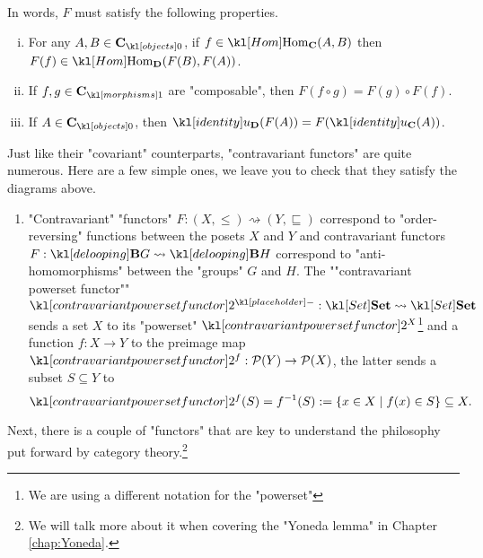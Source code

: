\documentclass[main.tex]{subfiles}
\begin{document}
\begin{defn}
\begin{minipage}{0.49\textwidth}
\begin{equation}
		\end{equation}
	\end{minipage}\\
	In words, $F$ must satisfy the following properties.
	\begin{enumerate}[i.]
		\item For any $A, B \in \obj{\mathbf{C}}$, if $f \in \Hom_{\mathbf{C}}(A,B)$ then $F(f) \in \Hom_{\mathbf{D}}(F(B), F(A))$.
		\item If $f,g \in \mor{\mathbf{C}}$ are "composable", then $F(f\circ g) = F(g) \circ F(f)$.
		\item If $A \in \obj{\mathbf{C}}$, then $\idu_{\mathbf{D}}(F(A)) = F(\idu_{\mathbf{C}}(A))$.
	\end{enumerate}
\end{defn}
\begin{exmps}
	Just like their "covariant" counterparts, "contravariant functors" are quite numerous. Here are a few simple ones, we leave you to check that they satisfy the diagrams above.
	\begin{enumerate}
		\item "Contravariant" "functors" $F: (X, \leq) \rightsquigarrow (Y, \sqsubseteq)$ correspond to "order-reversing" functions between the posets $X$ and $Y$ and contravariant functors $F: \deloop{G}\rightsquigarrow \deloop{H}$ correspond to "anti-homomorphisms" between the "groups" $G$ and $H$.
		\itemAP The ""contravariant powerset functor"" $\mPcontr{\placeholder}: \catSet \rightsquigarrow \catSet$ sends a set $X$ to its "powerset" $\mPcontr{X}$\footnote{We are using a different notation for the "powerset"} and a function $f: X\rightarrow Y$ to the preimage map $\mPcontr{f}:\mP(Y)\rightarrow \mP(X)$, the latter sends a subset $S\subseteq Y$ to \[\mPcontr{f}(S) = f^{-1}(S) := \{x \in X \mid f(x) \in S\} \subseteq X.\]
	\end{enumerate}
\end{exmps}
Next, there is a couple of "functors" that are key to understand the philosophy put forward by category theory.\footnote{We will talk more about it when covering the "Yoneda lemma" in Chapter \ref{chap:Yoneda}.}
\end{document}
